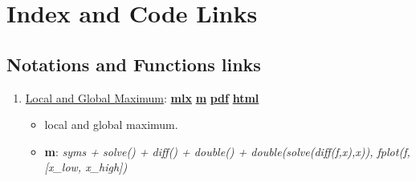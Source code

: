 \documentclass[
]{book}
\providecommand{\tightlist}{%
  \setlength{\itemsep}{0pt}\setlength{\parskip}{0pt}}
\begin{document}
\hypertarget{appendix-appendix}{%
\appendix}


\hypertarget{index-and-code-links}{%
\chapter{Index and Code Links}\label{index-and-code-links}}

\hypertarget{notations-and-functions-links}{%
\section{Notations and Functions links}\label{notations-and-functions-links}}

\begin{enumerate}
\def\labelenumi{\arabic{enumi}.}
\tightlist
\item
  \href{https://fanwangecon.github.io/Math4Econ/calconevar/htmlpdfm/localglobal.html}{Local and Global Maximum}: \href{https://github.com/FanWangEcon/Math4Econ/blob/master/calconevar/localglobal.mlx}{\textbf{mlx}} \textbar{} \href{https://github.com/FanWangEcon/Math4Econ/blob/master/calconevar/htmlpdfm/localglobal.m}{\textbf{m}} \textbar{} \href{https://github.com/FanWangEcon/Math4Econ/blob/master/calconevar/htmlpdfm/localglobal.pdf}{\textbf{pdf}} \textbar{} \href{https://fanwangecon.github.io/Math4Econ/calconevar/htmlpdfm/localglobal.html}{\textbf{html}}

  \begin{itemize}
  \tightlist
  \item
    local and global maximum.
  \item
    \textbf{m}: \emph{syms + solve() + diff() + double() + double(solve(diff(f,x),x)), fplot(f,{[}x\_low, x\_high{]})}
  \end{itemize}
\end{enumerate}

  
\end{document}
